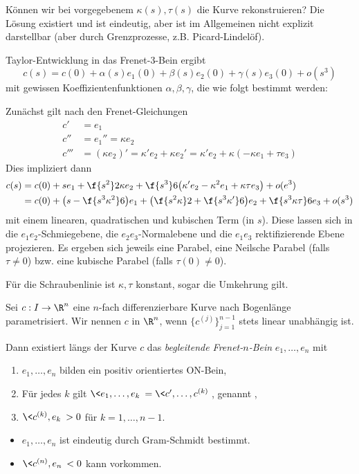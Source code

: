Können wir bei vorgegebenem $\kappa(s), \tau(s)$ die Kurve rekonstruieren?
Die Lösung existiert und ist eindeutig, aber ist im Allgemeinen nicht explizit darstellbar (aber durch Grenzprozesse, z.B. Picard-Lindelöf).

Taylor-Entwicklung in das Frenet-3-Bein ergibt
\[
	c(s) = c(0) + \alpha(s)e_1(0) + \beta(s) e_2(0) + \gamma(s) e_3(0) + o(s^3)
\]
mit gewissen Koeffizientenfunktionen $\alpha, \beta, \gamma$, die wie folgt bestimmt werden:

Zunächst gilt nach den Frenet-Gleichungen
\begin{align*}
	c' &= e_1 \\
	c'' &= e_1'' = \kappa e_2 \\
	c''' &= (\kappa e_2)' = \kappa' e_2 + \kappa e_2' = \kappa' e_2 + \kappa(-\kappa e_1 + \tau e_3)
\end{align*}
Dies impliziert dann
\begin{align*}
	c(s) &= c(0) + se_1 + \f {s^2}2 \kappa e_2 + \f {s^3}6 \big( \kappa' e_2 - \kappa^2 e_1 + \kappa \tau e_3 \big) + o(e^3) \\
	&= c(0) + \big( s - \f {s^3 \kappa^2}6 \big) e_1 + \big( \f {s^2 \kappa}2 + \f {s^3\kappa'}6 \big) e_2 + \f{s^3 \kappa \tau}6 e_3 + o(s^3)
\end{align*}
mit einem linearen, quadratischen und kubischen Term (in $s$).
Diese lassen sich in die $e_1e_2$-Schmiegebene, die $e_2e_3$-Normalebene und die $e_1e_3$ rektifizierende Ebene projezieren.
Es ergeben sich jeweils eine Parabel, eine Neilsche Parabel (falls $\tau \neq 0$) bzw. eine kubische Parabel (falls $\tau(0) \neq 0$).


Für die Schraubenlinie ist $\kappa, \tau$ konstant, sogar die Umkehrung gilt.




\begin{df}
	Sei $c: I \to \R^n$ eine $n$-fach differenzierbare Kurve nach Bogenlänge parametrisiert.
	Wir nennen $c$  in $\R^n$, wenn $\{c^{(j)}\}_{j=1}^{n-1}$ stets linear unabhängig ist.

	Dann existiert längs der Kurve $c$ das \emph{begleitende Frenet-$n$-Bein} $e_1, \dotsc, e_n$ mit
	\begin{enumerate}[1)]
		\item
			$e_1, \dotsc, e_n$ bilden ein positiv orientiertes ON-Bein,
		\item
			Für jedes $k$ gilt $\<e_1, \dotsc, e_k\> = \<c', \dotsc, c^{(k)}\>$, genannt ,
		\item
			$\<c^{(k)}, e_k\> > 0$ für $k = 1, \dotsc, n-1$.
	\end{enumerate}
	\begin{note}
		\begin{itemize}
			\item
				$e_1, \dotsc, e_n$ ist eindeutig durch Gram-Schmidt bestimmt.
			\item
				$\<c^{(n)}, e_n\> < 0$ kann vorkommen.
		\end{itemize}
	\end{note}
\end{df}


